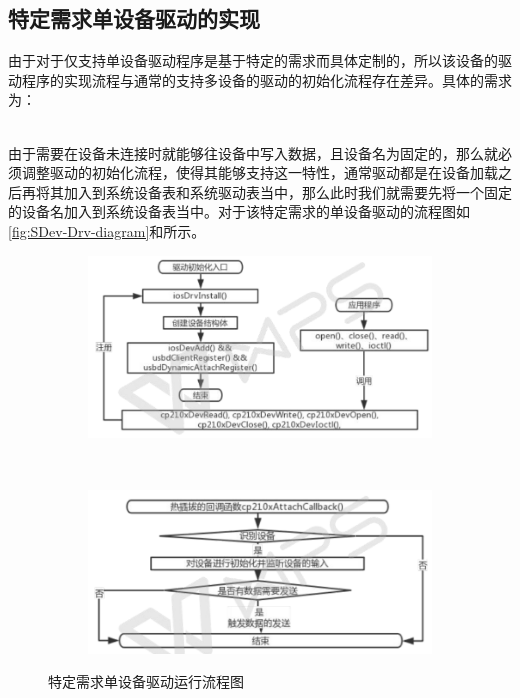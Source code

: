 \subsection{特定需求单设备驱动的实现}

	由于对于仅支持单设备驱动程序是基于特定的需求而具体定制的，所以该设备的驱动程序的实现流程与通常的支持多设备的驱动的初始化流程存在差异。具体的需求为：\\
\\

	由于需要在设备未连接时就能够往设备中写入数据，且设备名为固定的，那么就必须调整驱动的初始化流程，使得其能够支持这一特性，通常驱动都是在设备加载之后再将其加入到系统设备表和系统驱动表当中，那么此时我们就需要先将一个固定的设备名加入到系统设备表当中。对于该特定需求的单设备驱动的流程图如\autoref{fig:SDev-Drv-diagram}和所示。
\begin{figure}[h]
\centering
  \begin{subfigure}[b]{1.0\textwidth}
  \includegraphics[width=\textwidth]{./graphics/SDev-Drv-Diagram-a.pdf}
  \caption{}\label{fig:SDevice-Driver-diagram-a}
  \end{subfigure}
  ~
  \begin{subfigure}[b]{1.0\textwidth}
  \includegraphics[width=\textwidth]{./graphics/SDev-Drv-Diagram-b.pdf}
  \caption{}\label{fig:SDevice-Driver-diagram-b}
  \end{subfigure}
\caption{特定需求单设备驱动运行流程图}\label{fig:SDev-Drv-diagram}
\end{figure}




